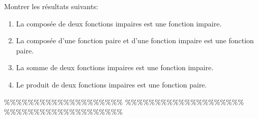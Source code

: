 



\begin{exercice}  \;
Montrer les r\'esultats suivants:
\begin{enumerate}
\item La compos\'ee de deux fonctions impaires est une fonction impaire. 
\item La compos\'ee d'une fonction paire et d'une fonction impaire est une fonction paire.
\item La somme de deux fonctions impaires est une fonction impaire.
\item Le produit de deux fonctions impaires est une fonction paire.
\end{enumerate}
\end{exercice}


\%\%\%\%\%\%\%\%\%\%\%\%\%\%\%\%\%\%\%\%
\%\%\%\%\%\%\%\%\%\%\%\%\%\%\%\%\%\%\%\%
\%\%\%\%\%\%\%\%\%\%\%\%\%\%\%\%\%\%\%\%



